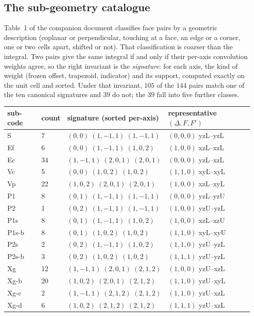 \documentclass[11pt]{article}
\theoremstyle{remark}
\begin{document}
\subsection{The sub-geometry catalogue}
\label{sec:cat}

Table~1 of the companion document classifies face pairs by a geometric description
(coplanar or perpendicular, touching at a face, an edge or a corner, one or two cells
apart, shifted or not). That classification is coarser than the integral. Two pairs give
the same integral if and only if their per-axis convolution weights agree, so the right
invariant is the \emph{signature}: for each axis, the kind of weight (frozen offset,
trapezoid, indicator) and its support, computed exactly on the unit cell and sorted. Under
that invariant, $105$ of the $144$ pairs match one of the ten canonical signatures and
$39$ do not; the $39$ fall into five further classes.

\begin{center}\small
\begin{tabular}{@{}llll@{}}
\toprule
sub-code & count & signature (sorted per-axis) & representative $(\Delta, F, F')$ \\
\midrule
S      & 7  & $(0,0)\;(1,-1,1)\;(1,-1,1)$ & $(0,0,0)$ yzL--yzL \\
Ef     & 6  & $(0,0)\;(1,-1,1)\;(1,0,2)$  & $(1,0,0)$ xzL--xzL \\
Ec     & 34 & $(1,-1,1)\;(2,0,1)\;(2,0,1)$ & $(0,0,0)$ yzL--xzL \\
Vc     & 5  & $(0,0)\;(1,0,2)\;(1,0,2)$   & $(1,1,0)$ xyL--xyL \\
Vp     & 22 & $(1,0,2)\;(2,0,1)\;(2,0,1)$ & $(1,0,0)$ xzL--xyL \\
P1     & 8  & $(0,1)\;(1,-1,1)\;(1,-1,1)$ & $(0,0,0)$ yzL--yzU \\
P2     & 1  & $(0,2)\;(1,-1,1)\;(1,-1,1)$ & $(1,0,0)$ yzU--yzL \\
P1s    & 8  & $(0,1)\;(1,-1,1)\;(1,0,2)$  & $(1,0,0)$ xzL--xzU \\
P1s-b  & 8  & $(0,1)\;(1,0,2)\;(1,0,2)$   & $(1,1,0)$ xyL--xyU \\
P2s    & 2  & $(0,2)\;(1,-1,1)\;(1,0,2)$  & $(1,1,0)$ yzU--yzL \\
P2s-b  & 3  & $(0,2)\;(1,0,2)\;(1,0,2)$   & $(1,1,1)$ yzU--yzL \\
Xg     & 12 & $(1,-1,1)\;(2,0,1)\;(2,1,2)$ & $(1,0,0)$ yzU--xzL \\
Xg-b   & 20 & $(1,0,2)\;(2,0,1)\;(2,1,2)$ & $(1,1,0)$ yzU--xyL \\
Xg-c   & 2  & $(1,-1,1)\;(2,1,2)\;(2,1,2)$ & $(1,1,0)$ yzU--xzL \\
Xg-d   & 6  & $(1,0,2)\;(2,1,2)\;(2,1,2)$ & $(1,1,1)$ yzU--xzL \\
\bottomrule
\end{tabular}
\end{center}
\end{document}
